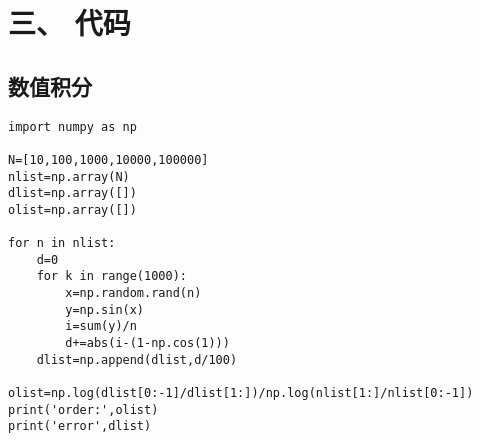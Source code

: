 \documentclass{article}
\begin{document}
    \setcounter{section}{3}
\section*{三、 代码}
\subsection{数值积分}
\lstset{language=Python}
\begin{lstlisting}
import numpy as np

N=[10,100,1000,10000,100000]
nlist=np.array(N)
dlist=np.array([])
olist=np.array([])

for n in nlist:
    d=0
    for k in range(1000):
        x=np.random.rand(n)
        y=np.sin(x)
        i=sum(y)/n
        d+=abs(i-(1-np.cos(1)))
    dlist=np.append(dlist,d/100)

olist=np.log(dlist[0:-1]/dlist[1:])/np.log(nlist[1:]/nlist[0:-1])
print('order:',olist)
print('error',dlist)
\end{lstlisting}
\end{document}

